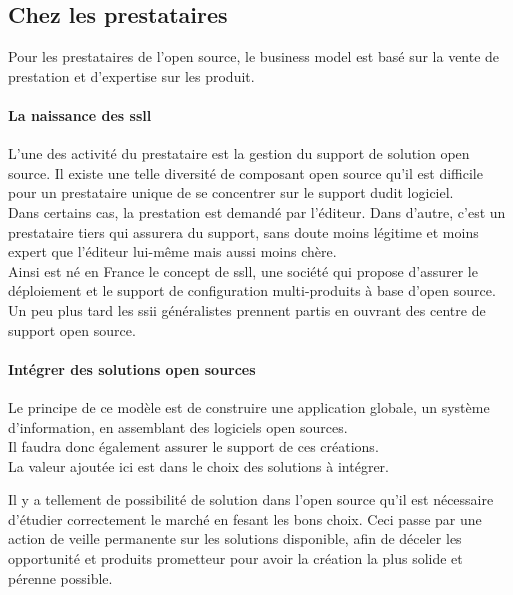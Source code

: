 		\subsection{Chez les prestataires}

			Pour les prestataires de l'open source, le business model est basé sur la vente de prestation et d'expertise sur les produit.

				\paragraph{La naissance des \acrfull{ssll}\\}

				L'une des activité du prestataire est la gestion du support de solution open source. Il existe une telle diversité de composant open source qu'il est difficile pour un prestataire unique de se concentrer sur le support dudit logiciel.\\

				Dans certains cas, la prestation est demandé par l'éditeur. Dans d'autre, c'est un prestataire tiers qui assurera du support, sans doute moins légitime et moins expert que l'éditeur lui-même mais aussi moins chère.\\

				Ainsi est né en France le concept de \acrshort{ssll}, une société qui propose d'assurer le déploiement et le support de configuration multi-produits à base d'open source.\\

				Un peu plus tard les \acrfull{ssii} généralistes prennent partis en ouvrant des centre de support open source.

				\paragraph{Intégrer des solutions open sources\\}

				Le principe de ce modèle est de construire une application globale, un système d'information, en assemblant des logiciels open sources.\\

				Il faudra donc également assurer le support de ces créations.\\
				La valeur ajoutée ici est dans le choix des solutions à intégrer. 

				Il y a tellement de possibilité de solution dans l'open source qu'il est nécessaire d'étudier correctement le marché en fesant les bons choix. Ceci passe par une action de veille permanente sur les solutions disponible, afin de déceler les opportunité et produits prometteur pour avoir la création la plus solide et pérenne possible.


